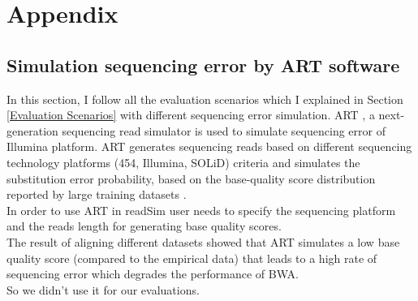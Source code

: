 \documentclass[11pt,a4paper]{report}
\begin{document}

\newpage
\appendix
\section*{Appendix}
\renewcommand{\thesubsection}{\Alph{subsection}}

\subsection{Simulation sequencing error by ART software} 
\label{Simulation sequencing error by ART software}

In this section, I follow all the evaluation scenarios which I explained in
Section \ref{Evaluation Scenarios}  with different sequencing error simulation.
ART \cite{art}, a next-generation sequencing read simulator is used to simulate sequencing
error of Illumina platform. 
ART generates sequencing reads based on different sequencing technology 
platforms (454, Illumina, SOLiD) criteria \cite{art} and simulates the
substitution error probability, based on the base-quality 
score distribution reported by large training datasets \cite{art}.\\

In order to use ART in readSim user needs to specify the sequencing
platform and the reads length for generating base quality scores.\\

The result of aligning different datasets showed that ART simulates a
low base quality score (compared to the empirical data) that leads to 
a high rate of sequencing error which degrades the performance of BWA.\\

So we didn't use it for our evaluations. \\
\end{document}
